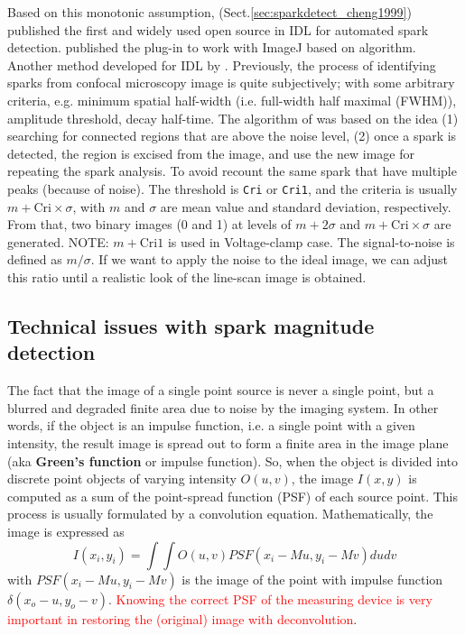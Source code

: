 Based on this monotonic assumption, \citep{cheng1999}
(Sect.\ref{sec:sparkdetect_cheng1999}) published the first and widely used open
source in IDL for automated spark detection.
\citep{picht2007} published the plug-in to work with ImageJ based on
\citep{cheng1999} algorithm. Another method developed for IDL by
\citep{sebille2005}. Previously, the process of identifying sparks from confocal
microscopy image is quite subjectively; with some arbitrary criteria, e.g.
minimum spatial half-width (i.e. full-width half maximal (FWHM)), amplitude
threshold, decay half-time. The algorithm of \citep{cheng1999} was based on the
idea (1) searching for connected regions that are above the noise level, (2)
once a spark is detected, the region is excised from the image, and use the new
image for repeating the spark analysis. To avoid recount the same spark that
have multiple peaks (because of noise). The threshold is \verb!Cri! or
\verb!Cri1!, and the criteria is usually $m+\text{Cri}\times \sigma$, with $m$
and $\sigma$ are mean value and standard deviation, respectively. From that, two
binary images (0 and 1) at levels of $m+2\sigma$ and $m+\text{Cri}\times \sigma$
are generated. NOTE: $m+\text{Cri1}$ is used in Voltage-clamp case. The
signal-to-noise is defined as $m/\sigma$. If we want to apply the noise to the
ideal image, we can adjust this ratio until a realistic look of the line-scan
image is obtained.


\subsection{Technical issues with spark magnitude detection}
\label{sec:techn-issu-with}

The fact that the image of a single point source is never a single
point, but a blurred and degraded finite area due to noise by the
imaging system.  In other words, if the object is an impulse function,
i.e. a single point with a given intensity, the result image is spread
out to form a finite area in the image plane (aka
{\bf Green's function} or impulse function). So, when the object is
divided into discrete point objects of varying intensity $O(u,v)$, the
image $I(x,y)$ is computed as a sum of the point-spread function (PSF)
of each source point. This process is usually formulated by a
convolution equation. Mathematically, the image is expressed as
\begin{equation}
  \label{eq:1033}
  I(x_i,y_i) = \int\int O(u,v) PSF(x_i-Mu,y_i-Mv)dudv
\end{equation}
with $PSF(x_i-Mu,y_i-Mv)$ is the image of the point with impulse
function $\delta(x_o-u,y_o-v)$.
\textcolor{red}{Knowing the correct PSF of the measuring device is
  very important in restoring the (original) image with
  deconvolution}.

